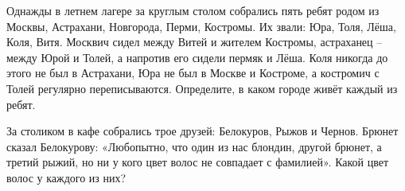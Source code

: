 

\begin{thm}
    Однажды в летнем лагере за круглым столом собрались пять ребят родом из Москвы, Астрахани, Новгорода, Перми, Костромы. Их звали: Юра, Толя, Лёша, Коля, Витя. Москвич сидел между Витей и жителем Костромы, астраханец – между Юрой и Толей, а напротив его сидели пермяк и Лёша. Коля никогда до этого не был в Астрахани, Юра не был в Москве и Костроме, а костромич с Толей регулярно переписываются. Определите, в каком городе живёт каждый из ребят.
\end{thm}

\begin{thm}
    За столиком в кафе собрались трое друзей: Белокуров, Рыжов и Чернов. Брюнет сказал Белокурову: «Любопытно, что один из нас блондин, другой брюнет, а третий рыжий, но ни у кого цвет волос не совпадает с фамилией». Какой цвет волос у каждого из них?
\end{thm}



